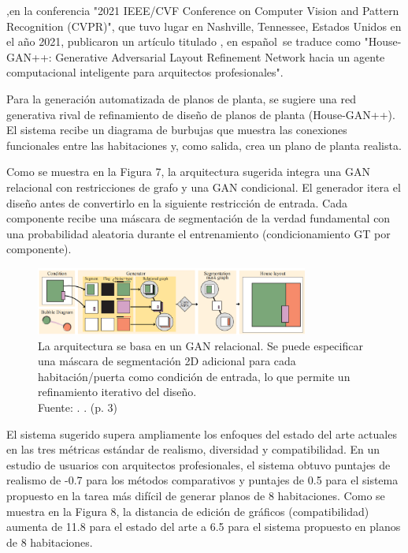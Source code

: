 \cite{pr_nauata2021housegan} ,en la conferencia "2021 IEEE/CVF Conference on Computer Vision and Pattern Recognition (CVPR)", que tuvo lugar en Nashville, Tennessee, Estados Unidos en el año 2021, publicaron un artículo titulado , en español se traduce como "House-GAN++: Generative Adversarial Layout Refinement Network hacia un agente computacional inteligente para arquitectos profesionales".

Para la generación automatizada de planos de planta, se sugiere una red generativa rival de refinamiento de diseño de planos de planta (House-GAN++). El sistema recibe un diagrama de burbujas que muestra las conexiones funcionales entre las habitaciones y, como salida, crea un plano de planta realista.

Como se muestra en la Figura 7, la arquitectura sugerida integra una GAN relacional con restricciones de grafo y una GAN condicional. El generador itera el diseño antes de convertirlo en la siguiente restricción de entrada. Cada componente recibe una máscara de segmentación de la verdad fundamental con una probabilidad aleatoria durante el entrenamiento (condicionamiento GT por componente).

\begin{figure}[!ht]
	\begin{center}
		\includegraphics[width=0.8\textwidth]{2/figures/nauata2021.png}
		\caption[La arquitectura se basa en un GAN relacional. Se puede especificar una máscara de segmentación 2D adicional para cada habitación/puerta como condición de entrada, lo que permite un refinamiento iterativo del diseño.]{La arquitectura se basa en un GAN relacional. Se puede especificar una máscara de segmentación 2D adicional para cada habitación/puerta como condición de entrada, lo que permite un refinamiento iterativo del diseño.\\
		Fuente: \cite{pr_nauata2021housegan}. . (p. 3)}
		\label{2:fig115}
	\end{center}
\end{figure}

El sistema sugerido supera ampliamente los enfoques del estado del arte actuales en las tres métricas estándar de realismo, diversidad y compatibilidad. En un estudio de usuarios con arquitectos profesionales, el sistema obtuvo puntajes de realismo de -0.7 para los métodos comparativos y puntajes de 0.5 para el sistema propuesto en la tarea más difícil de generar planos de 8 habitaciones. Como se muestra en la Figura 8, la distancia de edición de gráficos (compatibilidad) aumenta de 11.8 para el estado del arte a 6.5 para el sistema propuesto en planos de 8 habitaciones.

